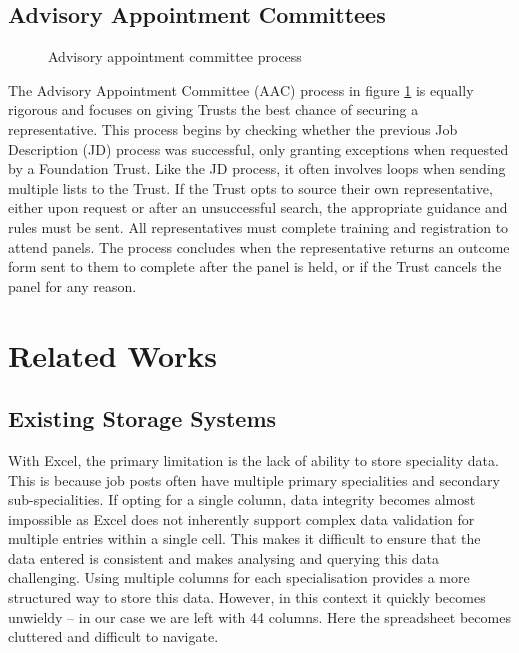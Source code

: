 \subsection{Advisory Appointment Committees}
\begin{figure}[h]
\centering
{}
\vspace{-20pt}
\caption{Advisory appointment committee process}
\label{fig:aac}
\end{figure}
\vspace{-5pt}
The Advisory Appointment Committee (AAC) process in figure \ref{fig:aac} is equally rigorous and focuses on giving Trusts the best chance of securing a representative. This process begins by checking whether the previous Job Description (JD) process was successful, only granting exceptions when requested by a Foundation Trust. Like the JD process, it often involves loops when sending multiple lists to the Trust. If the Trust opts to source their own representative, either upon request or after an unsuccessful search, the appropriate guidance and rules must be sent. All representatives must complete training and registration to attend panels. The process concludes when the representative returns an outcome form sent to them to complete after the panel is held, or if the Trust cancels the panel for any reason.

\section{Related Works}
\subsection{Existing Storage Systems}
With Excel, the primary limitation is the lack of ability to store speciality data. This is because job posts often have multiple primary specialities and secondary sub-specialities. If opting for a single column, data integrity becomes almost impossible as Excel does not inherently support complex data validation for multiple entries within a single cell. This makes it difficult to ensure that the data entered is consistent and makes analysing and querying this data challenging. Using multiple columns for each specialisation provides a more structured way to store this data. However, in this context it quickly becomes unwieldy – in our case we are left with 44 columns. Here the spreadsheet becomes cluttered and difficult to navigate.

